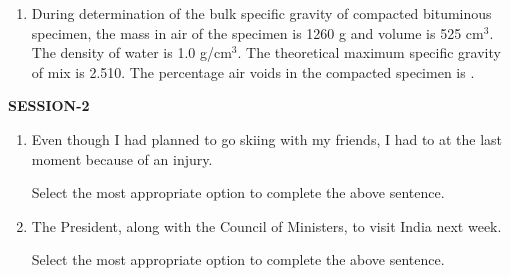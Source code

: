 \documentclass[journal,12pt,onecolumn]{article}
\theoremstyle{remark}
\begin{document}
\begin{enumerate}
\hfill{}

\item During determination of the bulk specific gravity of compacted bituminous specimen, the mass in air of the specimen is 1260 g and volume is 525 cm$^3$. The density of water is 1.0 g/cm$^3$. The theoretical maximum specific gravity of mix is 2.510.
The percentage air voids in the compacted specimen is \underline{\hspace{2cm}} .

\hfill{}

\end{enumerate}


\textbf{SESSION-2}

\begin{enumerate}
    \item Even though I had planned to go skiing with my friends, I had to \underline{\hspace{2cm}} at the last moment because of an injury.
    
    Select the most appropriate option to complete the above sentence.

    \hfill{}
    \begin{enumerate}
    \end{enumerate}

    \item The President, along with the Council of Ministers, \underline{\hspace{2cm}} to visit India next week.
    
    Select the most appropriate option to complete the above sentence.

    \hfill{}
    \begin{enumerate}
    \end{enumerate}


\end{enumerate}
\end{document}

